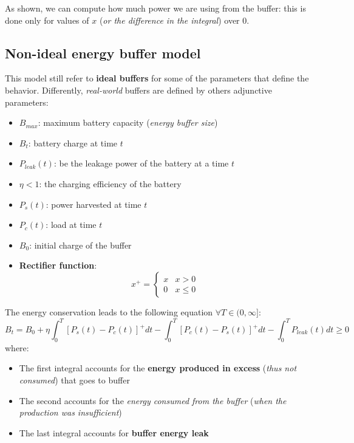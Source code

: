 \documentclass[10pt,a4paper]{report}
\theoremstyle{definition}
\begin{document}
As shown, we can compute how much power we are using from the buffer: this is done only for values of $x$ (\textit{or the difference in the integral}) over 0.
\subsection{Non-ideal energy buffer model}\label{sec:non-ideal-energy-buffer-model}
This model still refer to \textbf{ideal buffers} for some of the parameters that define the behavior. Differently, \textit{real-world} buffers are defined by others adjunctive parameters:
\begin{itemize}
	\item 
	$B_{max}$: maximum battery capacity (\textit{energy buffer size})
	\item 
	$B_{t}$: battery charge at time $t$
	\item 
	$P_{leak}(t)$: be the leakage power of the battery at a time $t$
	\item 
	$\eta < 1$: the charging efficiency of the battery
	\item 
	$P_{s}(t)$: power harvested at time $t$
	\item 
	$P_{c}(t)$: load at time $t$
	\item 
	$B_{0}$: initial charge of the buffer
	\item 
	\textbf{Rectifier function}:\begin{equation}
		x^{+} =
		\begin{cases}
			x &  x > 0 \\
			0        & x \leq 0
		\end{cases}
	\end{equation}
\end{itemize}

The energy conservation leads to the following equation $\forall T \in (0,\infty]$:
\begin{equation}
	B_{t} = B_{0}+\eta \int_{0}^{T} [P_{s}(t) - P_{c}(t)]^{+}dt - \int_{0}^{T} [P_{c}(t) - P_{s}(t)]^{+}dt - \int_{0}^{T} P_{leak}(t)dt \geq 0
\end{equation}
 where:
\begin{itemize}
	\item 
	The first integral accounts for the \textbf{energy produced in excess} (\textit{thus not consumed}) that goes to buffer
	\item 
	The second accounts for the \textit{\textit{energy consumed} from the buffer} (\textit{when the production was insufficient})
	\item 
	The last integral accounts for \textbf{buffer energy leak}
\end{itemize}
\end{document}
